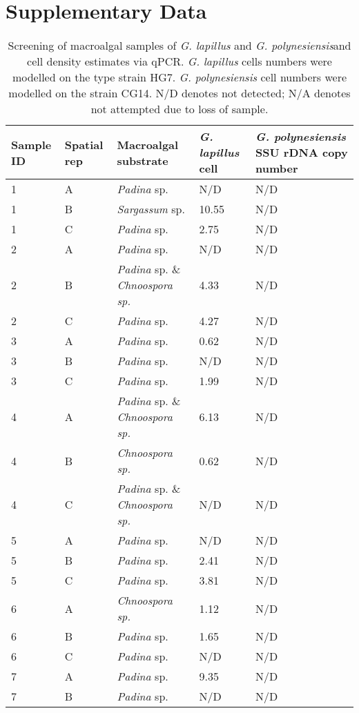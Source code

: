 \documentclass[12pt]{article}
\begin{document}
\section{Supplementary Data}
\FloatBarrier
\begin{longtable}{ | p{1cm} | p{1cm} | p{3cm} | p{4cm} | p{4cm} | }
\caption{Screening of macroalgal samples of \emph{G. lapillus} and \emph{G. polynesiensis}and cell density estimates via qPCR. \emph{G. lapillus} cells numbers were modelled on the type strain HG7. \emph{G. polynesiensis} cell numbers were modelled on the strain CG14. N/D denotes not detected; N/A denotes not attempted due to loss of sample.}\\
\hline
\label{tbl:MacroalgaeTable}
\textbf{Sample ID}&\textbf{Spatial rep}&\textbf{Macroalgal substrate}&\textbf{\textit{G. lapillus} cell}&\textbf{\textit{G. polynesiensis} SSU rDNA copy number }\\
\hline
1&A&\emph{Padina} sp.&N/D&N/D\\
\hline
1&B&\emph{Sargassum} sp.&10.55
&N/D\\
\hline
1&C&\emph{Padina} sp.&2.75
&N/D\\
\hline
2&A&\emph{Padina} sp.&N/D&N/D\\
\hline
2&B&\emph{Padina} sp. \& \emph{Chnoospora sp.}&4.33
&N/D\\
\hline
2&C&\emph{Padina} sp.&4.27
&N/D\\
\hline
3&A&\emph{Padina} sp.&0.62
&N/D\\
\hline
3&B&\emph{Padina} sp.&N/D&N/D\\
\hline
3&C&\emph{Padina} sp.&1.99
&N/D\\
\hline
4&A&\emph{Padina} sp. \& \emph{Chnoospora sp.}&6.13
&N/D\\
\hline
4&B&\emph{Chnoospora sp.}&0.62
&N/D\\
\hline
4&C&\emph{Padina} sp. \& \emph{Chnoospora sp.}&N/D&N/D\\
\hline
5&A&\emph{Padina} sp.&N/D&N/D\\
\hline
5&B&\emph{Padina} sp.&2.41
&N/D\\
\hline
5&C&\emph{Padina} sp.&3.81
&N/D\\
\hline
6&A&\emph{Chnoospora sp.}&1.12
&N/D\\
\hline
6&B&\emph{Padina} sp.&1.65
&N/D\\
\hline
6&C&\emph{Padina} sp.&N/D&N/D\\
\hline
7&A&\emph{Padina} sp.&9.35
&N/D\\
\hline
7&B&\emph{Padina} sp.&N/D&N/D\\

\end{longtable}
\end{document}

